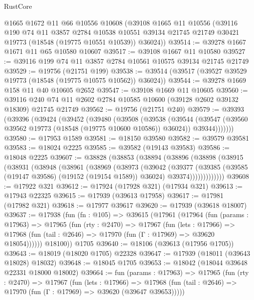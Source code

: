 \begin{lexlean}{RustCore}
\begin{coremodule}
    @1665
    @1672
    @11
    @66
    @10556
    @10608
    (@39108
      @1665
      @11
      @10556
      (@39116
        @190
        @74
        @11
        @3857
        @2784
        @10538
        @10551
        @39134
        @21745
        @21749
        @30421
        @19773
        (@18548 (@19775 @10551 @10539))
        @36024))
@39514 := @39278 @1667 @1671 @11 @65 @10580 @10607
@39517 := @39108 @1667 @11 @10580
@39527 := @39116 @199 @74 @11 @3857 @2784 @10561 @10575 @39134 @21745 @21749
@39529 := @19756 (@21751 @199)
@39538 := @39514 (@39517 (@39527 @39529 @19773 (@18548 (@19775 @10575 @10562)) @36024))
@39544 := @39278 @1669 @158 @11 @40 @10605 @2652
@39547 := @39108 @1669 @11 @10605
@39560 := @39116 @240 @74 @11 @2602 @2784 @10585 @10600 (@39128 @2602 @39132 @18309) @21745 @21749
@39562 := @19756 (@21751 @240)
@39579 := @39393
    (@39396
      (@39424
        (@39452
          (@39480
            (@39508
              (@39538
                (@39544
                  (@39547 (@39560 @39562 @19773 (@18548 (@19775 @10600 @10586)) @36024))
                  @39344)))))))
@39580 := @17953 @1589
@39581 := @18150 @39580
@39582 := @39579 @39581
@39583 := @18024 @2225
@39585 := @39582 (@19143 @39583)
@39586 := @18048 @2225
@39607 := @38828
    (@38853
      (@38894
        (@38896
          (@38898
            (@38915
              (@38931
                (@38948
                  (@38961
                    (@38969
                      (@38973
                        (@39042
                          (@39377
                            (@39385
                              (@39585 (@19147 @39586) (@19152 (@19154 @1589)) @36024)
                              @39374)))))))))))))
@39608 := @17922 @321
@39612 := @17924 (@17928 @321) (@17934 @321)
@39613 := @17943 @22325
@39615 := @17939 (@39613 @17958)
@39617 := @17981 (@17982 @321)
@39618 := @17977 @39617
@39620 := @17939 (@39618 @18007)
@39637 := @17938
    (fun (fn : @105) =>
    @39615
      (@17961
        (@17964
          (fun (params : @17963) =>
          @17965
            (fun (rty : @2470) =>
            @17967
              (fun (lets : @17966) =>
              @17968 (fun (tail : @2646) => @17970 (fun (Γ : @17969) => @39620 @18054))))))
        @18100))
    @1705
@39640 := @18106 (@39613 (@17956 @1705))
@39643 := @18019 (@18020 @1705) @22328
@39647 := @17939 (@18011 (@39643 @18028) @18032)
@39648 := @18045 @1705
@39653 := @18042 (@18044 @39648 @22331 @18000 @18002)
@39664 := fun (params : @17963) =>
  @17965
    (fun (rty : @2470) =>
    @17967
      (fun (lets : @17966) =>
      @17968 (fun (tail : @2646) => @17970 (fun (Γ : @17969) => @39620 (@39647 @39653)))))

\end{coremodule}
\end{lexlean}
